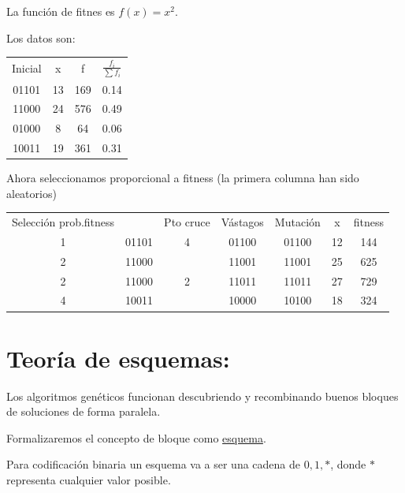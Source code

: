 \documentclass{apuntes}
\begin{document}
\begin{example}

La función de fitnes es $f(x) = x^2$.

Los datos son:

\begin{center}
\begin{tabular}{cccc}
Inicial & x & f & $\frac{f_i}{\sum f_i}$\\
01101&13&169&0.14\\
11000&24&576&0.49\\
01000&8&64&0.06\\
10011&19&361&0.31
\end{tabular}
\end{center}

Ahora seleccionamos proporcional a fitness (la primera columna han sido aleatorios)

\begin{center}
\begin{tabular}{ccccccc}
Selección prob.fitness && Pto cruce & Vástagos & Mutación & x & fitness\\
1 & 01101 & 4 & 01100 & 01100 & 12 & 144\\
2 & 11000 &   & 11001 & 11001 & 25 & 625\\
2 & 11000 & 2 & 11011 & 11011 & 27 & 729\\
4 & 10011 &   & 10000 & 10100 & 18 & 324
\end{tabular}
\end{center}

\end{example}

\section{Teoría de esquemas:}

Los algoritmos genéticos funcionan descubriendo y recombinando buenos bloques de soluciones de forma paralela.

Formalizaremos el concepto de bloque como \underline{esquema}.

Para codificación binaria un esquema va a ser una cadena de $0,1,*$, donde $*$ representa cualquier valor posible.
\end{document}
